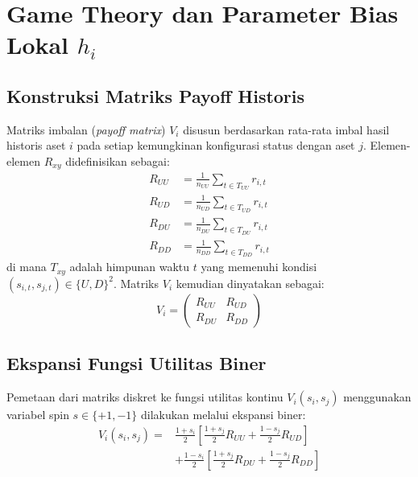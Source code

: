 \section{Game Theory dan Parameter Bias Lokal $h_i$}

\subsection{Konstruksi Matriks Payoff Historis}
Matriks imbalan (\textit{payoff matrix}) $V_i$ disusun berdasarkan rata-rata imbal hasil historis aset $i$ pada setiap kemungkinan konfigurasi status dengan aset $j$. Elemen-elemen $R_{xy}$ didefinisikan sebagai:
\begin{align}
R_{UU} &= \frac{1}{n_{UU}} \sum_{t \in T_{UU}} r_{i,t} \\
R_{UD} &= \frac{1}{n_{UD}} \sum_{t \in T_{UD}} r_{i,t} \\
R_{DU} &= \frac{1}{n_{DU}} \sum_{t \in T_{DU}} r_{i,t} \\
R_{DD} &= \frac{1}{n_{DD}} \sum_{t \in T_{DD}} r_{i,t}
\end{align}
di mana $T_{xy}$ adalah himpunan waktu $t$ yang memenuhi kondisi $(s_{i,t}, s_{j,t}) \in \{U, D\}^2$. Matriks $V_i$ kemudian dinyatakan sebagai:
\begin{equation}
V_i = \begin{pmatrix} R_{UU} & R_{UD} \\ R_{DU} & R_{DD} \end{pmatrix}
\end{equation}

\subsection{Ekspansi Fungsi Utilitas Biner}
Pemetaan dari matriks diskret ke fungsi utilitas kontinu $V_i(s_i, s_j)$ menggunakan variabel spin $s \in \{+1, -1\}$ dilakukan melalui ekspansi biner:
\begin{equation}
\begin{split}
V_i(s_i, s_j) =& \frac{1+s_i}{2} \left[ \frac{1+s_j}{2} R_{UU} + \frac{1-s_j}{2} R_{UD} \right] \\
&+ \frac{1-s_i}{2} \left[ \frac{1+s_j}{2} R_{DU} + \frac{1-s_j}{2} R_{DD} \right]
\end{split}
\label{eq:v_function_expansion_detail}
\end{equation}

